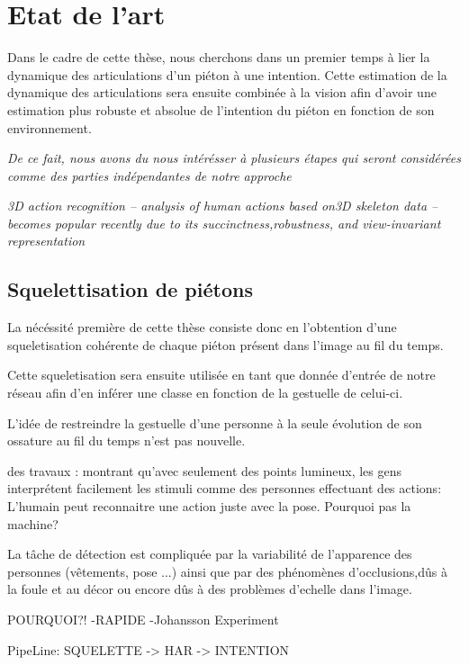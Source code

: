 \section{Etat de l'art}
\label{sec:SOTA}

Dans le cadre de cette thèse, nous cherchons dans un premier temps à lier la dynamique des articulations d'un piéton à une intention. Cette estimation de la dynamique des articulations sera ensuite combinée à la vision afin d’avoir une estimation plus robuste et absolue de l'intention du piéton en fonction de son environnement.

\textit{De ce fait, nous avons du nous intérésser à plusieurs étapes qui seront considérées comme des parties indépendantes de notre approche}

\textit{3D action recognition – analysis of human actions based on3D  skeleton  data  –  becomes  popular  recently  due  to  its  succinctness,robustness, and view-invariant representation}

\subsection{Squelettisation de piétons}
La nécéssité première de cette thèse consiste donc en l'obtention d'une squeletisation cohérente de chaque piéton présent dans l'image au fil du temps.

Cette squeletisation sera ensuite utilisée en tant que donnée d'entrée de notre réseau afin d'en inférer une classe en fonction de la gestuelle de celui-ci.

L'idée de restreindre la gestuelle d'une personne à la seule évolution de son ossature au fil du temps n'est pas nouvelle.

des travaux  \cite{johansson1973visual,johansson1976spatio}: montrant qu'avec seulement des points lumineux, les gens interprétent facilement les stimuli comme des personnes effectuant des actions: L'humain peut reconnaitre une action juste avec la pose. Pourquoi pas la machine?

La tâche de détection est compliquée par la variabilité de l’apparence des personnes (vêtements, pose ...)
ainsi que par des phénomènes d’occlusions,dûs à la foule et au décor ou encore dûs à des problèmes d'echelle dans l'image.





POURQUOI?!
-RAPIDE
-Johansson Experiment 

PipeLine: SQUELETTE -> HAR -> INTENTION

